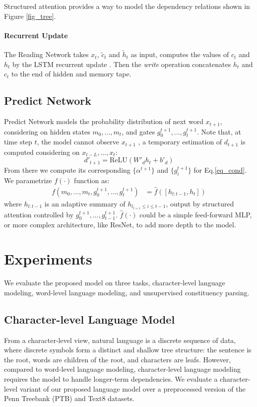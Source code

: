 \documentclass{article} \usepackage{iclr2018_conference,times}
\begin{document}
Structured attention provides a way to model the dependency relations shown in Figure \ref{fig_tree}.

\paragraph{Recurrent Update} The Reading Network takes $x_t$, $\tilde { c } _{ t }$ and $\tilde { h } _{ t }$ as input, computes the values of $c_t$ and $h_t$ by the LSTM recurrent update \citep{hochreiter1997long}.
Then the \textit{write} operation concatenates $h_t$ and $c_t$ to the end of hidden and memory tape.

\subsection{Predict Network}


Predict Network models the probability distribution of next word $x_{t+1}$, considering on hidden states $m_0,...,m_t$, and gates $g_0^{t+1},...,g_{t}^{t+1}$. Note that, at time step $t$, the model cannot observe $x_{t+1}$ , a temporary estimation of $d_{t+1}$ is computed considering on $x_{t-L},...,x_t$:
\begin{equation} \label{eq_g_estimate}
	d'_{t+1}=\mathrm{ReLU}(W'_d h_t + b'_d)
\end{equation}
From there we compute its corresponding $\{\alpha^{t+1}\}$ and $\{g_i^{t+1}\}$ for Eq.\ref{eq_cond}.
We parametrize $f(\cdot)$ function as:
\begin{align}
f(m_{0},...,m_t,g_0^{t+1},...,g_{t}^{t+1}) &= \hat{f}([h_{l:t-1},h_{t}]) \label{eq_pred}
\end{align}
where $h_{l:t-1}$ is an adaptive summary of $h_{l_{t+1} \leq i \leq t-1}$, output by structured attention controlled by $g_0^{t+1},...,g_{t-1}^{t+1}$. $\hat{f}(\cdot)$ could be a simple feed-forward MLP, or more complex architecture, like ResNet, to add more depth to the model. 







\section{Experiments}
We evaluate the proposed model on three tasks, character-level language modeling, word-level language modeling, and unsupervised constituency parsing. 


\subsection{Character-level Language Model}
From a character-level view, natural language is a discrete sequence of data, where discrete symbols form a distinct and shallow tree structure: the sentence is the root, words are children of the root, and characters are leafs. However, compared to word-level language modeling, character-level language modeling requires the model to handle longer-term dependencies. We evaluate a character-level variant of our proposed language model over a preprocessed version of the Penn Treebank (PTB) and Text8 datasets.
\end{document}
